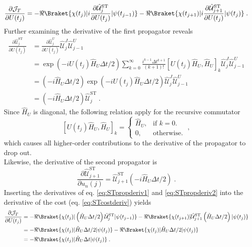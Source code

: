 \begin{equation}
	\frac{\partial \mathcal{J}_T}{\partial U (t_j)} = - \Re \Braket{\chi (t_j) | i  \frac{\partial \hat{\mathcal{U}}_{j}^{\mathrm{ST}}}{\partial U (t_j)} | \psi (t_{j-1})} - \Re \Braket{\chi (t_{j+1}) | i \frac{ \partial \hat{\mathcal{U}}_{j+1}^{\mathrm{ST}}}{\partial U (t_j)} | \psi (t_{j})} \; . \label{eq:STcostderiv}
\end{equation}
Further examining the derivative of the first propagator reveals
\begin{align}
	\frac{\partial \hat{\mathcal{U}}_{j}^{\mathrm{ST}}}{\partial U (t_j)} &=  \frac{\partial \hat{\mathcal{U}}_{j}^{U}}{\partial U (t_j)} \hat{\mathcal{U}}_{j}^{J} \hat{\mathcal{U}}_{j-1}^{U} \nonumber \\
	&=  \exp \left( -i U (t_j) \hat{H}_U  \Delta t /2 \right)  \sum_{k = 0}^{\infty }  \frac{i^{k-1} \Delta t^{k+1}}{(k+1)!} \left[ U (t_j) \hat{H}_U  ,  \hat{H}_U \right]_k \hat{\mathcal{U}}_{j}^{J} \hat{\mathcal{U}}_{j-1}^{U} \nonumber \\
	&= \left( -i \hat{H}_U \Delta t /2 \right) \exp \left( -i U(t_j) \hat{H}_U  \Delta t /2 \right)   \hat{\mathcal{U}}_{j}^{J} \hat{\mathcal{U}}_{j-1}^{U} \nonumber \\
	&= \left( -i \hat{H}_U \Delta t /2 \right) \hat{\mathcal{U}}_{j}^{\mathrm{ST}} \; . \label{eq:STpropderiv1}
\end{align}
Since $\hat{H}_U$ is diagonal, the following relation apply for the recursive commutator 
\begin{equation}
	\left[ U (t_j) \hat{H}_U  ,  \hat{H}_U \right]_k =  
	\begin{cases}
    	\hat{H}_U, & \text{if $k = 0$}.\\
    	0, & \text{otherwise}.
  	\end{cases} \; ,
\end{equation}  
which causes all higher-order contributions to the derivative of the propagator to drop out.\\
Likewise, the derivative of the second propagator is
\begin{equation}
	\frac{\partial \hat{\mathcal{U}}_{j+1}^{\mathrm{ST}}}{\partial u_n (j)} =  \hat{\mathcal{U}}_{j+1}^{\mathrm{ST}} \left( -i \hat{H}_U \Delta t /2 \right) \; . \label{eq:STpropderiv2}
\end{equation}
Inserting the derivatives of eq. \eqref{eq:STpropderiv1} and \eqref{eq:STpropderiv2} into the derivative of the cost (eq. \eqref{eq:STcostderiv}) yields
\begin{align}
	\frac{\partial \mathcal{J}_T}{\partial U (t_j)} &= - \Re \Braket{\chi (t_j) |   \left(  \hat{H}_U \Delta t /2 \right) \hat{\mathcal{U}}_{j}^{\mathrm{ST}} | \psi (t_{j-1})} - \Re \Braket{\chi (t_{j+1}) |  \hat{\mathcal{U}}_{j+1}^{\mathrm{ST}} \left(  \hat{H}_U \Delta t /2 \right) | \psi (t_{j})} \nonumber \\
	&= - \Re \Braket{\chi (t_j) |  \hat{H}_U \Delta t /2  | \psi (t_{j})} - \Re \Braket{\chi (t_{j}) |  \hat{H}_U \Delta t /2   | \psi (t_{j})} \nonumber \\
	&= - \Re \Braket{\chi (t_j) | \hat{H}_U \Delta t | \psi (t_{j})} \; . \label{eq:STcostgrad}
\end{align}  
